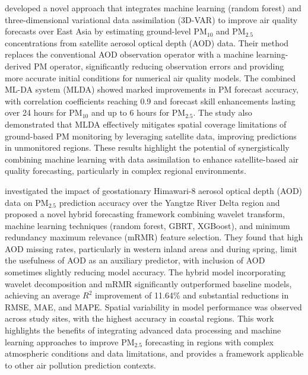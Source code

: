 \documentclass[11pt]{article}
\begin{document}
\citet{lee2022air} developed a novel approach that integrates machine learning (random forest) and three-dimensional variational data assimilation (3D-VAR) to improve air quality forecasts over East Asia by estimating ground-level PM$_{10}$ and PM$_{2.5}$ concentrations from satellite aerosol optical depth (AOD) data. Their method replaces the conventional AOD observation operator with a machine learning-derived PM operator, significantly reducing observation errors and providing more accurate initial conditions for numerical air quality models. The combined ML-DA system (MLDA) showed marked improvements in PM forecast accuracy, with correlation coefficients reaching 0.9 and forecast skill enhancements lasting over 24 hours for PM$_{10}$ and up to 6 hours for PM$_{2.5}$. The study also demonstrated that MLDA effectively mitigates spatial coverage limitations of ground-based PM monitoring by leveraging satellite data, improving predictions in unmonitored regions. These results highlight the potential of synergistically combining machine learning with data assimilation to enhance satellite-based air quality forecasting, particularly in complex regional environments.

\citet{karimian2023evaluation} investigated the impact of geostationary Himawari-8 aerosol optical depth (AOD) data on PM$_{2.5}$ prediction accuracy over the Yangtze River Delta region and proposed a novel hybrid forecasting framework combining wavelet transform, machine learning techniques (random forest, GBRT, XGBoost), and minimum redundancy maximum relevance (mRMR) feature selection. They found that high AOD missing rates, particularly in western inland areas and during spring, limit the usefulness of AOD as an auxiliary predictor, with inclusion of AOD sometimes slightly reducing model accuracy. The hybrid model incorporating wavelet decomposition and mRMR significantly outperformed baseline models, achieving an average \( R^{2} \) improvement of 11.64\% and substantial reductions in RMSE, MAE, and MAPE. Spatial variability in model performance was observed across study sites, with the highest accuracy in coastal regions. This work highlights the benefits of integrating advanced data processing and machine learning approaches to improve PM$_{2.5}$ forecasting in regions with complex atmospheric conditions and data limitations, and provides a framework applicable to other air pollution prediction contexts.
\end{document}
